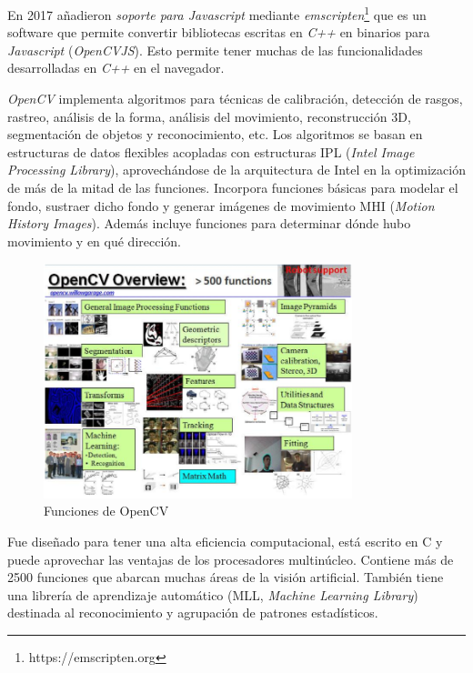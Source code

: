 En 2017 añadieron \textit{soporte para Javascript} mediante \textit{emscripten}\footnote{https://emscripten.org} que es un software que permite convertir bibliotecas escritas en \textit{C++} en binarios para \textit{Javascript} (\textit{OpenCVJS}). Esto permite tener muchas de las funcionalidades desarrolladas en \textit{C++} en el navegador.

\textit{OpenCV} implementa algoritmos para técnicas de calibración, detección de rasgos, rastreo, análisis de la forma, análisis del movimiento, reconstrucción 3D, segmentación de objetos y reconocimiento, etc. Los algoritmos se basan  en  estructuras de datos flexibles acopladas con estructuras IPL (\textit{Intel  Image Processing Library}), aprovechándose de la arquitectura de Intel en la optimización de más de la mitad de las funciones. Incorpora funciones básicas para modelar el fondo, sustraer dicho  fondo y generar imágenes de movimiento MHI  (\textit{Motion  History  Images}).  Además  incluye  funciones para determinar dónde hubo movimiento y en qué dirección. 

\begin{figure}[H]
  \begin{center}
    \includegraphics[width=0.8\textwidth]{figures/herramientas/opencv.png}
		\caption{Funciones de OpenCV}
		\label{fig.opencv}
		\end{center}
\end{figure}

Fue diseñado para tener una alta eficiencia computacional, está escrito en C y puede aprovechar las ventajas de los procesadores multinúcleo. Contiene más  de  2500  funciones  que  abarcan  muchas  áreas  de  la  visión  artificial.  También  tiene  una librería   de   aprendizaje   automático   (MLL,  \textit{Machine   Learning   Library})   destinada   al reconocimiento  y agrupación de patrones estadísticos.

